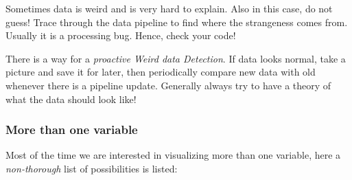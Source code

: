 Sometimes data is weird and is very hard to explain. Also in this case, do not guess! Trace through the data pipeline to find where the strangeness comes from. Usually it is a processing bug. Hence, check your code!

There is a way for a \emph{proactive Weird data Detection}. If data looks normal, take a picture and save it for later, then periodically compare new data with old whenever there is a pipeline update. Generally always try to have a theory of what the data should look like!

\subsubsection{More than one variable}
 
Most of the time we are interested in visualizing more than one variable, here a \emph{non-thorough} list of possibilities is listed:

